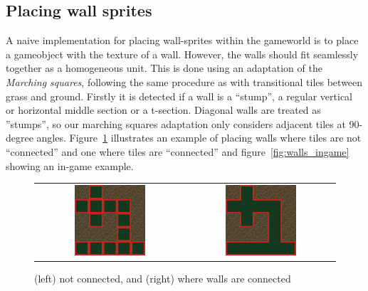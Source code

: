 \subsection{Placing wall sprites}
A naive implementation for placing wall-sprites within the gameworld is to place a gameobject with the texture of a wall.
However, the walls should fit seamlessly together as a homogeneous unit.
This is done using an adaptation of the \textit{Marching squares}, following the same procedure as with transitional tiles between grass and ground.
Firstly it is detected if a wall is a ``stump'', a regular vertical or horizontal middle section or a t-section. 
Diagonal walls are treated as ''stumps'', so our marching squares adaptation only considers adjacent tiles at 90-degree angles.
Figure~\ref{fig:wall_comparison} illustrates an example of placing walls where tiles are not ``connected'' and one where tiles are ``connected'' and figure~\ref{fig:walls_ingame} showing an in-game example.

\begin{figure}[H]
    \centering
    \begin{tabular}{cc}
        \includegraphics[width=0.5\textwidth]{figures/generating_levels/wall_no_border.png}
        &
        \includegraphics[width=0.5\textwidth]{figures/generating_levels/wall_with_border.png}
    \end{tabular}
    \caption{(left) not connected, and (right) where walls are connected}\label{fig:wall_comparison}
\end{figure}

